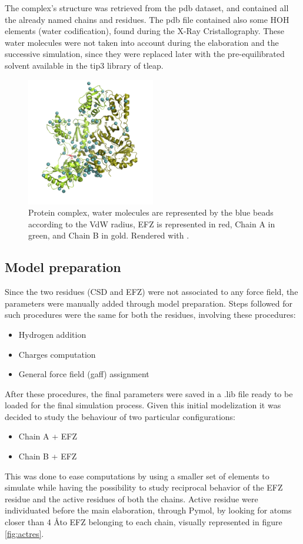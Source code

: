 \documentclass[12pt]{article}
\begin{document}
The complex's structure was retrieved from the pdb dataset, and contained all the already named chains and residues. The pdb file contained also some HOH elements (water codification), found during the X-Ray Cristallography\cite{SAKABE1991448}.
These water molecules were not taken into account during the elaboration and the successive simulation, since they were replaced later with the pre-equilibrated solvent available in the tip3 library of tleap.
\begin{figure}
    \centering
    \includegraphics[width=0.5\textwidth]{../figures/water.png}
    \caption{Protein complex, water molecules are represented by the blue beads according to the VdW radius, EFZ is represented in red, Chain A in green, and Chain B in gold. Rendered with \cite[Pymol]{pymol}. \label{fig:total}}
\end{figure}

\subsection{Model preparation}
Since the two residues (CSD and EFZ) were not associated to any force field, the parameters were manually added through model preparation.
Steps followed for such procedures were the same for both the residues, involving these procedures:

\begin{itemize}
    \item Hydrogen addition
    \item Charges computation
    \item General force field (gaff) assignment
\end{itemize}

After these procedures, the final parameters were saved in a .lib file ready to be loaded for the final simulation process.
Given this initial modelization it was decided to study the behaviour of two particular configurations:
\begin{itemize}
    \item Chain A + EFZ
    \item Chain B + EFZ
\end{itemize}
This was done to ease computations by using a smaller set of elements to simulate while having the possibility to study reciprocal behavior of the EFZ residue and the active residues of both the chains. Active residue were individuated before the main elaboration, through Pymol\cite{pymol}, by looking for atoms closer than 4 \AA to EFZ belonging to each chain, visually represented in figure \ref{fig:actres}.
\end{document}
